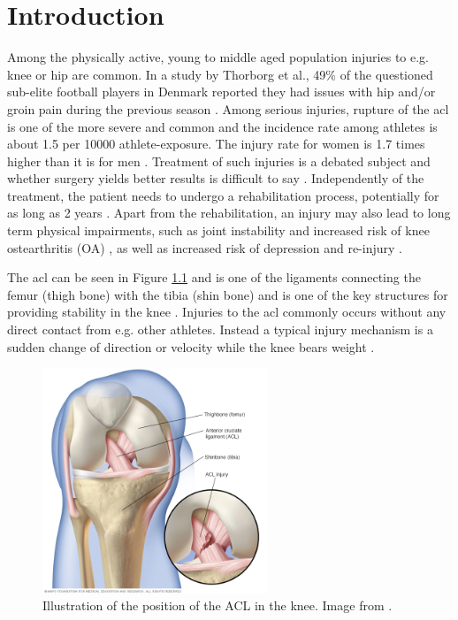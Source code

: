 \chapter{Introduction} \label{ch:intro}
Among the physically active, young to middle aged population injuries to e.g. knee or hip are common. In a study by Thorborg et al., 49\% of the questioned sub-elite football players in Denmark reported they had issues with hip and/or groin pain during the previous season \cite{Thorborg2017}. Among serious injuries, rupture of the \gls{acl} is one of the more severe and common and the incidence rate among athletes is about 1.5 per 10000 athlete-exposure. The injury rate for women is 1.7 times higher than it is for men \cite{Montalvo2019}. Treatment of such injuries is a debated subject and whether surgery yields better results is difficult to say \cite{Krause2018, Monk2016}. Independently of the treatment, the patient needs to undergo a rehabilitation process, potentially for as long as 2 years \cite{Nagelli2017}.
Apart from the rehabilitation, an injury may also lead to long term physical impairments, such as joint instability \cite{Ageberg2002} and increased risk of knee ostearthritis (OA) \cite{Lohmander2007}, as well as increased risk of depression \cite{Crichlow2006} and re-injury \cite{Paterno2012}.


The \gls{acl} can be seen in Figure \ref{fig:acl} and is one of the ligaments connecting the femur (thigh bone) with the tibia (shin bone) and is one of the key structures for providing stability in the knee \cite{Duthon2006}. Injuries to the \gls{acl} commonly occurs without any direct contact from e.g. other athletes. Instead a typical injury mechanism is a sudden change of direction or velocity while the knee bears weight \cite{Wetters2016}.

\begin{figure}
  \centering
  \includegraphics[width=0.6\textwidth]{files/figs/intro/acl.png}
  \caption{Illustration of the position of the ACL in the knee. Image from \cite{MayoACL}.}
  \label{fig:acl}
\end{figure}

